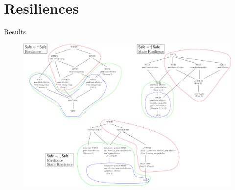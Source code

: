 \documentclass{beamer}
\begin{document}
	\section{Resiliences}
  \begin{frame}{Results}
  
  
   \begin{center}
 	\begin{figure}
 	\vspace{-0.25cm}
\includegraphics[width=1.00\textwidth]{All_results}
	\end{figure}
\end{center}  
    
    
        
  \end{frame}
\end{document}
